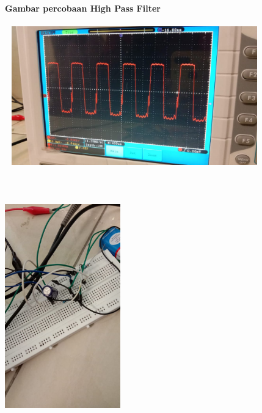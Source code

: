 \documentclass[12pt,a4paper]{article}
\begin{document}
\newpage
\begin{figure}
\paragraph{Gambar percobaan High Pass Filter}
\paragraph{ }
\begin{center}

\includegraphics[width=12cm, height=6cm]{HPF1.png}

\includegraphics[width=5cm, height=12cm]{HPF2.png}

\end{center}
\end{figure}
\vspace{2cm}
\end{document}
